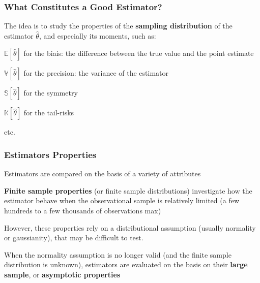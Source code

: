 \documentclass{beamer}
\newenvironment{wideitemize}{\itemize\addtolength{\itemsep}{10pt}}{\enditemize}
\newenvironment{wideenumerate}{\enumerate\addtolength{\itemsep}{10pt}}{\endenumerate}
\begin{document}
  
  \begin{frame}
    \frametitle{What Constitutes a Good Estimator?}
    The idea is to study the properties of the \textbf{sampling distribution} of the estimator $\hat{\theta}$, and especially its moments, such as:\\

    \medskip

    \begin{wideitemize}
    \item $\mathbb{E}[\hat{\theta}]$ for the biais: the difference between the true value and the point estimate
    \item $\mathbb{V}[\hat{\theta}]$ for the precision: the variance of the estimator
    \item $\mathbb{S}[\hat{\theta}]$ for the symmetry
    \item $\mathbb{K}[\hat{\theta}]$ for the tail-risks  
    \item etc.
    \end{wideitemize}
  \end{frame}


  \begin{frame}
    \frametitle{Estimators Properties}
    Estimators are compared on the basis of a variety of attributes

    \begin{wideenumerate}
      \item \textbf{Finite sample properties} (or finite sample distributions) investigate how the estimator behave when the observational sample is relatively limited (a few hundreds to a few thousands of observations max)
      \item However, these properties rely on a distributional assumption (usually normality or gaussianity), that may be difficult to test. 
      \item When the normality assumption is no longer valid (and the finite sample distribution is unknown), estimators are evaluated on the basis on their \textbf{large sample}, or \textbf{asymptotic properties}
    \end{wideenumerate}    
  \end{frame}
\end{document}
